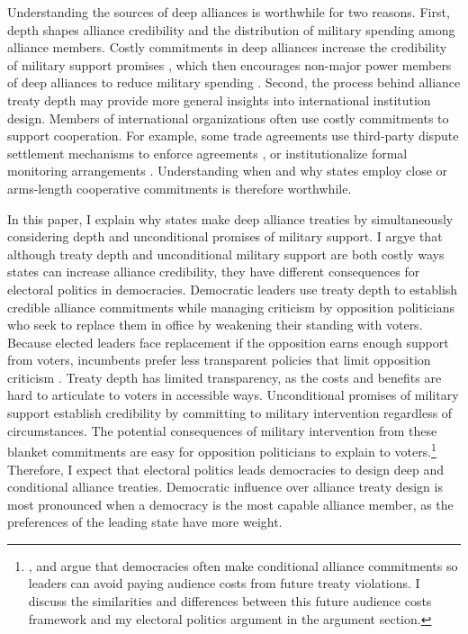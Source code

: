 \documentclass[12pt]{article}
\begin{document}
Understanding the sources of deep alliances is worthwhile for two reasons.
First, depth shapes alliance credibility and the distribution of military spending among alliance members. 
Costly commitments in deep alliances increase the credibility of military support promises \citep{Morrow1994}, which then encourages non-major power members of deep alliances to reduce military spending \citep{Alley2020}.  
Second, the process behind alliance treaty depth may provide more general insights into international institution design. 
Members of international organizations often use costly commitments to support cooperation. 
For example, some trade agreements use third-party dispute settlement mechanisms to enforce agreements \citep{Smith2000}, or institutionalize formal monitoring arrangements \citep{Duretal2013}.  
Understanding when and why states employ close or arms-length cooperative commitments is therefore worthwhile. 


In this paper, I explain why states make deep alliance treaties by simultaneously considering depth and unconditional promises of military support. 
I argye that although treaty depth and unconditional military support are both costly ways states can increase alliance credibility, they have different consequences for electoral politics in democracies. 
Democratic leaders use treaty depth to establish credible alliance commitments while managing criticism by opposition politicians who seek to replace them in office by weakening their standing with voters.
Because elected leaders face replacement if the opposition earns enough support from voters, incumbents prefer less transparent policies that limit opposition criticism \citep{Kono2006}.
Treaty depth has limited transparency, as the costs and benefits are hard to articulate to voters in accessible ways. 
Unconditional promises of military support establish credibility by committing to military intervention regardless of circumstances.  
The potential consequences of military intervention from these blanket commitments are easy for opposition politicians to explain to voters.\footnote{\citet{Mattes2012}, \citet{Chibaetal2015} and \citet{FjelstulReiter2019} argue that democracies often make conditional alliance commitments so leaders can avoid paying audience costs from future treaty violations. I discuss the similarities and differences between this future audience costs framework and my electoral politics argument in the argument section.} 
Therefore, I expect that electoral politics leads democracies to design deep and conditional alliance treaties. 
Democratic influence over alliance treaty design is most pronounced when a democracy is the most capable alliance member, as the preferences of the leading state have more weight. 
\end{document}
